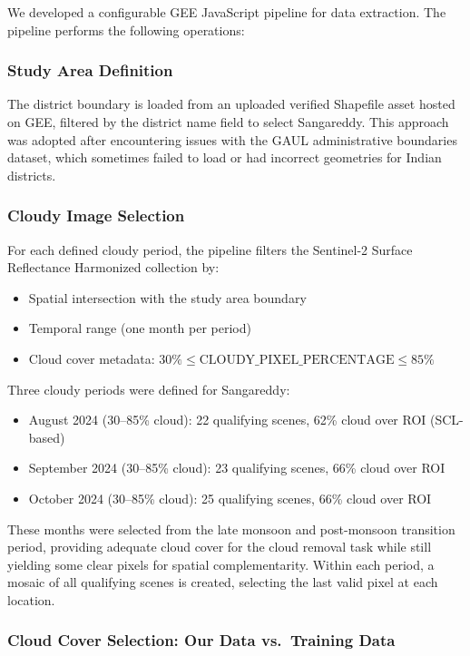 \documentclass[12pt,a4paper]{article}
\begin{document}
We developed a configurable GEE JavaScript pipeline for data extraction. The pipeline performs the following operations:

\subsubsection{Study Area Definition}
The district boundary is loaded from an uploaded verified Shapefile asset hosted on GEE, filtered by the district name field to select Sangareddy. This approach was adopted after encountering issues with the GAUL administrative boundaries dataset, which sometimes failed to load or had incorrect geometries for Indian districts.

\subsubsection{Cloudy Image Selection}
For each defined cloudy period, the pipeline filters the Sentinel-2 Surface Reflectance Harmonized collection by:
\begin{itemize}[leftmargin=2em]
    \item Spatial intersection with the study area boundary
    \item Temporal range (one month per period)
    \item Cloud cover metadata: $30\% \leq \text{CLOUDY\_PIXEL\_PERCENTAGE} \leq 85\%$
\end{itemize}

Three cloudy periods were defined for Sangareddy:
\begin{itemize}[leftmargin=2em]
    \item August 2024 (30--85\% cloud): 22 qualifying scenes, 62\% cloud over ROI (SCL-based)
    \item September 2024 (30--85\% cloud): 23 qualifying scenes, 66\% cloud over ROI
    \item October 2024 (30--85\% cloud): 25 qualifying scenes, 66\% cloud over ROI
\end{itemize}

These months were selected from the late monsoon and post-monsoon transition period, providing adequate cloud cover for the cloud removal task while still yielding some clear pixels for spatial complementarity. Within each period, a mosaic of all qualifying scenes is created, selecting the last valid pixel at each location.

\subsubsection{Cloud Cover Selection: Our Data vs.\ Training Data}
\end{document}
